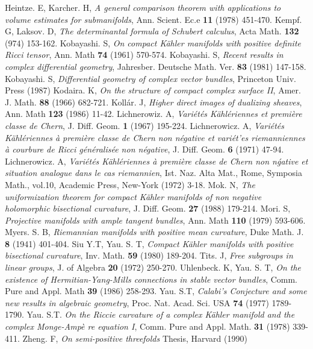 \begin{thebibliography}{99}
  Heintze. E, Karcher. H, \textit{A general comparison theorem with applications to volume estimates for submanifolds}, Ann. Scient. Ec.e {\bf 11} (1978) 451-470.
  Kempf. G, Laksov. D, \textit{The determinantal formula of Schubert calculus}, Acta Math. {\bf 132} (974) 153-162.
  Kobayashi. S, \textit{On compact K\"ahler manifolds with positive definite Ricci tensor}, Ann. Math {\bf 74} (1961) 570-574.
  Kobayashi. S, \textit{Recent results in complex differential geometry}, Jahresber. Deutsche Math. Ver. {\bf 83} (1981) 147-158.
  Kobayashi. S, \textit{Differential geometry of complex vector bundles}, Princeton Univ. Press (1987)
 Kodaira. K, \textit{On the structure of compact complex surface II}, Amer. J. Math. {\bf 88} (1966) 682-721.
  Koll\'ar. J, \textit{Higher direct images of dualizing sheaves}, Ann. Math {\bf 123} (1986) 11-42.
 Lichnerowiz. A, \textit{Vari\'et\'es K\"ahl\'eriennes et premi\`ere classe de Chern}, J. Diff. Geom. {\bf 1} (1967) 195-224.
  Lichnerowicz. A, \textit{Vari\'et\'es K\"ahl\'eriennes \`a premi\`ere classe de Chern non n\'egative et vari\'et'es riemanniennes \`a courbure de Ricci g\'en\'eralis\'ee non n\'egative}, J. Diff. Geom. {\bf 6} (1971) 47-94.
  Lichnerowicz. A, \textit{Vari\'et\'es K\"ahl\'eriennes \`a premi\`ere classe de Chern non n\'gative et situation analogue dans le cas riemannien}, Ist. Naz. Alta Mat., Rome, Symposia Math., vol.10, Academic Press, New-York (1972) 3-18.
  Mok. N, \textit{The uniformization theorem for compact K\"ahler manifolds of non negative holomorphic bisectional curvature}, J. Diff. Geom. {\bf 27} (1988) 179-214.
  Mori. S, \textit{Projective manifolds with ample tangent bundles}, Ann. Math {\bf 110} (1979) 593-606.
  Myers. S. B, \textit{Riemannian manifolds with positive mean curvature}, Duke Math. J. {\bf 8} (1941) 401-404.
  Siu Y.T, Yau. S. T, \textit{Compact K\"ahler manifolds with positive bisectional curvature}, Inv. Math. {\bf 59} (1980) 189-204.
   Tits. J, \textit{Free subgroups in linear groups}, J. of Algebra {\bf 20} (1972) 250-270.
  Uhlenbeck. K, Yau. S. T, \textit{On the existence of Hermitian-Yang-Mills connections in stable vector bundles}, Comm. Pure and Appl. Math {\bf 39} (1986) 258-293.
  Yau. S.T, \textit{Calabi's Conjecture and some new results in algebraic geometry}, Proc. Nat. Acad. Sci. USA {\bf 74} (1977) 1789-1790.
  Yau. S.T. \textit{On the Riccie curvature of a complex K\"ahler manifold and the complex Monge-Amp\`e re equation I}, Comm. Pure and Appl. Math. {\bf 31} (1978) 339-411.
  Zheng. F, \textit{On semi-positive threefolds} Thesis, Harvard (1990)
\end{thebibliography}


